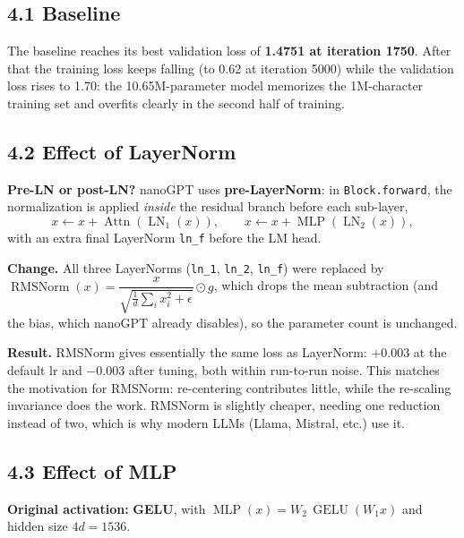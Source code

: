 \documentclass[11pt]{article}
\begin{document}
\subsection*{4.1 Baseline}
\begin{center}\end{center}
The baseline reaches its best validation loss of \textbf{1.4751 at iteration 1750}. After that the training loss keeps falling (to 0.62 at iteration 5000) while the validation loss rises to 1.70: the 10.65M-parameter model memorizes the 1M-character training set and overfits clearly in the second half of training.

\subsection*{4.2 Effect of LayerNorm}
\textbf{Pre-LN or post-LN?} nanoGPT uses \textbf{pre-LayerNorm}: in \texttt{Block.forward}, the normalization is applied \emph{inside} the residual branch before each sub-layer,
\[
x \leftarrow x+\operatorname{Attn}(\operatorname{LN}_1(x)),\qquad x\leftarrow x+\operatorname{MLP}(\operatorname{LN}_2(x)),
\]
with an extra final LayerNorm \texttt{ln\_f} before the LM head.

\textbf{Change.} All three LayerNorms (\texttt{ln\_1}, \texttt{ln\_2}, \texttt{ln\_f}) were replaced by
$\operatorname{RMSNorm}(x)=\dfrac{x}{\sqrt{\frac{1}{d}\sum_i x_i^2+\epsilon}}\odot g$,
which drops the mean subtraction (and the bias, which nanoGPT already disables), so the parameter count is unchanged.

\begin{center}\end{center}

\textbf{Result.} RMSNorm gives essentially the same loss as LayerNorm: $+0.003$ at the default lr and $-0.003$ after tuning, both within run-to-run noise. This matches the motivation for RMSNorm: re-centering contributes little, while the re-scaling invariance does the work. RMSNorm is slightly cheaper, needing one reduction instead of two, which is why modern LLMs (Llama, Mistral, etc.) use it.

\subsection*{4.3 Effect of MLP}
\textbf{Original activation:} \textbf{GELU}, with $\operatorname{MLP}(x)=W_2\,\operatorname{GELU}(W_1x)$ and hidden size $4d=1536$.
\end{document}
